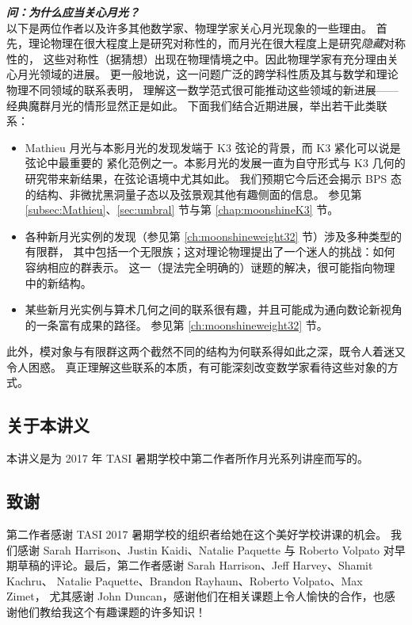 \vspace{10pt}
\noindent
{\bf \em 问：为什么应当关心月光？}\\\noindent
以下是两位作者以及许多其他数学家、物理学家关心月光现象的一些理由。
首先，理论物理在很大程度上是研究对称性的，而月光在很大程度上是研究\emph{隐藏}对称性的，
这些对称性（据猜想）出现在物理情境之中。因此物理学家有充分理由关心月光领域的进展。
更一般地说，这一问题广泛的跨学科性质及其与数学和理论物理不同领域的联系表明，
理解这一数学范式很可能推动这些领域的新进展——经典魔群月光的情形显然正是如此。
下面我们结合近期进展，举出若干此类联系：

\begin{itemize}
\item  Mathieu 月光与本影月光的发现发端于 K3 弦论的背景，而 K3 紧化可以说是弦论中最重要的
       紧化范例之一。本影月光的发展一直为自守形式与 K3 几何的研究带来新结果，在弦论语境中尤其如此。
       我们预期它今后还会揭示 BPS 态的结构、非微扰黑洞量子态以及弦景观其他有趣侧面的信息。
       参见第 \ref{subsec:Mathieu}、\ref{sec:umbral} 节与第 \ref{chap:moonshineK3} 节。

\item  各种新月光实例的发现（参见第 \ref{ch:moonshineweight32} 节）涉及多种类型的有限群，
       其中包括一个无限族；这对理论物理提出了一个迷人的挑战：如何容纳相应的群表示。
       这一（提法完全明确的）谜题的解决，很可能指向物理中的新结构。

\item  某些新月光实例与算术几何之间的联系很有趣，并且可能成为通向数论新视角的一条富有成果的路径。
       参见第 \ref{ch:moonshineweight32} 节。
\end{itemize}

此外，模对象与有限群这两个截然不同的结构为何联系得如此之深，既令人着迷又令人困惑。
真正理解这些联系的本质，有可能深刻改变数学家看待这些对象的方式。


\subsection*{关于本讲义}

本讲义是为 2017 年 TASI 暑期学校中第二作者所作月光系列讲座而写的。

\subsection*{致谢}

第二作者感谢 TASI 2017 暑期学校的组织者给她在这个美好学校讲课的机会。
我们感谢 Sarah Harrison、Justin Kaidi、Natalie Paquette 与 Roberto Volpato
对早期草稿的评论。最后，第二作者感谢 Sarah Harrison、Jeff Harvey、Shamit Kachru、
Natalie Paquette、Brandon Rayhaun、Roberto Volpato、Max Zimet，
尤其感谢 John Duncan，感谢他们在相关课题上令人愉快的合作，也感谢他们教给我这个有趣课题的许多知识！
